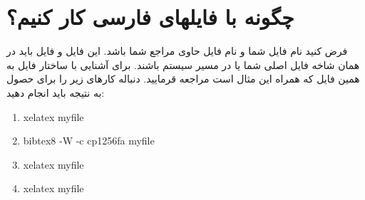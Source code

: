 \documentclass{article}
\begin{document}



\appendix
\section{چگونه با فایلهای  فارسی کار کنیم؟}
فرض کنید نام فایل شما  و نام فایل حاوی مراجع شما  باشد. این فایل و فایل  باید در همان شاخه فایل اصلی شما یا در مسیر سیستم باشند. برای آشنایی با ساختار فایل  به همین فایل که همراه این مثال است مراجعه قرمایید. دنباله کارهای زیر را برای حصول به نتیجه باید انجام دهید:
\begin{latin}
\begin{enumerate}
\item xelatex myfile
\item bibtex8 -W -c cp1256fa myfile
\item xelatex myfile
\item xelatex myfile
\end{enumerate}
\end{latin}
\end{document}
